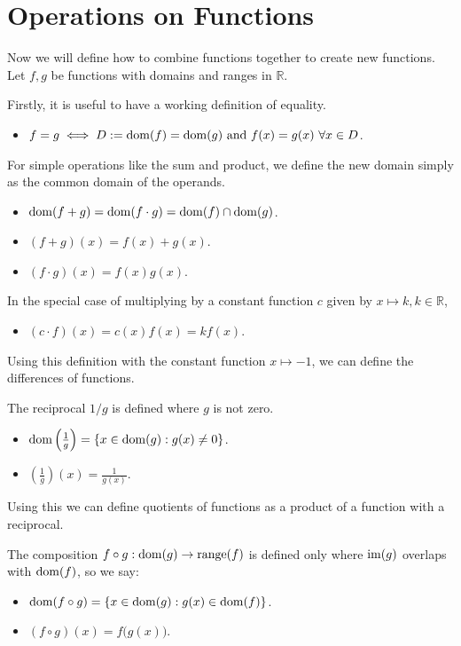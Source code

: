 \documentclass[../real_analysis.tex]{subfiles}
\begin{document}
    \section{Operations on Functions}\label{sec:operations-on-functions}
        Now we will define how to combine functions together to create new functions. Let $f, g$ be functions with domains and ranges in $\mathbb{R}$.
        \begin{definition}
            Firstly, it is useful to have a working definition of equality.
            \begin{itemize}
                \item $f = g \iff D:= \dom(f) = \dom(g)\ \text{and}\ f(x) = g(x)\ \forall x \in D$.
            \end{itemize}
            For simple operations like the sum and product, we define the new domain simply as the common domain of the operands.
            \begin{itemize}
                \item $\operatorname{dom}(f+g) = \operatorname{dom}(f \cdot g) = \operatorname{dom}(f) \cap \operatorname{dom}(g)$.
                \item $(f+g)(x) = f(x) + g(x)$.
                \item $(f \cdot g)(x) = f(x)g(x)$.
            \end{itemize}
            In the special case of multiplying by a constant function $c$ given by $x \mapsto k, k \in \mathbb{R}$,
            \begin{itemize}
                \item $(c \cdot f)(x) = c(x)f(x) = kf(x)$.
            \end{itemize}
            Using this definition with the constant function $x \mapsto -1$, we can define the differences of functions.

            The reciprocal $1 / g$ is defined where $g$ is not zero.
            \begin{itemize}
                \item $\operatorname{dom}\left(\frac{1}{g}\right) = \{x \in \operatorname{dom}(g) : g(x) \ne 0\}$.
                \item $\left(\frac{1}{g}\right)(x) = \frac{1}{g(x)}$.
            \end{itemize}
            Using this we can define quotients of functions as a product of a function with a reciprocal.
        \end{definition}
        \begin{definition}[Composition]
            The composition $f \circ g: \operatorname{dom}(g) \to \operatorname{range}(f)$ is defined only where $\operatorname{im}(g)$ overlaps with $\operatorname{dom}(f)$, so we say:
            \begin{itemize}
                \item $\operatorname{dom}(f \circ g) = \{x \in \operatorname{dom}(g) : g(x) \in \operatorname{dom}(f)\}$.
                \item $(f \circ g)(x) = f\big(g(x)\big)$.
            \end{itemize}
        \end{definition}
\end{document}
